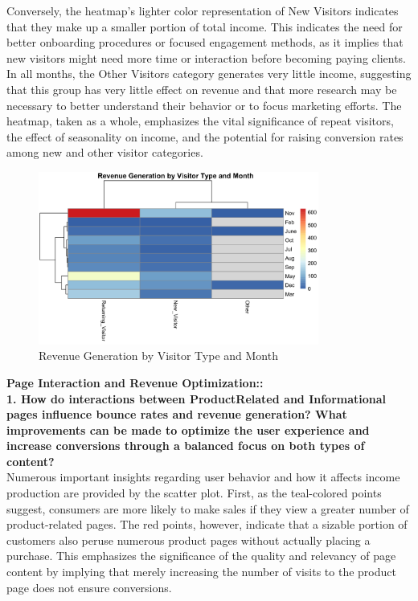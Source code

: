\documentclass[12pt]{article}
\begin{document}
Conversely, the heatmap's lighter color representation of New Visitors indicates that they make up a smaller portion of total income. This indicates the need for better onboarding procedures or focused engagement methods, as it implies that new visitors might need more time or interaction before becoming paying clients. In all months, the Other Visitors category generates very little income, suggesting that this group has very little effect on revenue and that more research may be necessary to better understand their behavior or to focus marketing efforts. The heatmap, taken as a whole, emphasizes the vital significance of repeat visitors, the effect of seasonality on income, and the potential for raising conversion rates among new and other visitor categories.
\begin{figure}[h]
    \centering
    \includegraphics[width=0.82\textwidth]{Revenue Generation by Visitor Type and Month.png}  
    \caption{Revenue Generation by Visitor Type and Month}
\end{figure}
\vspace{0.5cm}

\textbf{Page Interaction and Revenue Optimization::}\\

\textbf{1. How do interactions between Product\-Related and Informational pages influence bounce rates and revenue generation? What improvements can be made to optimize the user experience and increase conversions through a balanced
focus on both types of content?} \\[5pt] %

\FloatBarrier
Numerous important insights regarding user behavior and how it affects income production are provided by the scatter plot. First, as the teal-colored points suggest, consumers are more likely to make sales if they view a greater number of product-related pages. The red points, however, indicate that a sizable portion of customers also peruse numerous product pages without actually placing a purchase. This emphasizes the significance of the quality and relevancy of page content by implying that merely increasing the number of visits to the product page does not ensure conversions.
\end{document}
